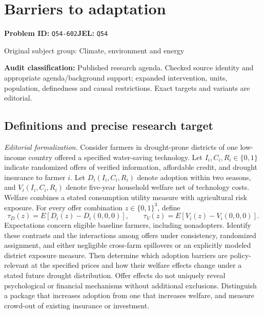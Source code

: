 \documentclass[11pt,a4paper]{article}
\begin{document}
\section*{Barriers to adaptation}
\textbf{Problem ID:} \texttt{Q54-602}\quad \textbf{JEL:} \texttt{Q54}\par
\label{problem:OP-0434}
{\sffamily\small\color{muted}Original subject group: Climate, environment and energy\par}
\label{definitions:problem:30007716}
\textbf{Audit classification:} Published research agenda. Checked source identity and appropriate agenda/background support; expanded intervention, units, population, definedness and causal restrictions. Exact targets and variants are editorial.
\subsection*{Definitions and precise research target}
\textit{Editorial formalization.} Consider farmers in drought-prone districts of one low-income country offered a specified water-saving technology. Let \(I_i,C_i,R_i\in\{0,1\}\) indicate randomized offers of verified information, affordable credit, and drought insurance to farmer \(i\). Let \(D_i(I_i,C_i,R_i)\) denote adoption within two seasons, and \(V_i(I_i,C_i,R_i)\) denote five-year household welfare net of technology costs. Welfare combines a stated consumption utility measure with agricultural risk exposure. For every offer combination \(z\in\{0,1\}^3\), define
\[\tau_D(z)=E[D_i(z)-D_i(0,0,0)],\qquad\tau_V(z)=E[V_i(z)-V_i(0,0,0)].\]
Expectations concern eligible baseline farmers, including nonadopters. Identify these contrasts and the interactions among offers under consistency, randomized assignment, and either negligible cross-farm spillovers or an explicitly modeled district exposure measure. Then determine which adoption barriers are policy-relevant at the specified prices and how their welfare effects change under a stated future drought distribution. Offer effects do not uniquely reveal psychological or financial mechanisms without additional exclusions. Distinguish a package that increases adoption from one that increases welfare, and measure crowd-out of existing insurance or investment.
\end{document}
